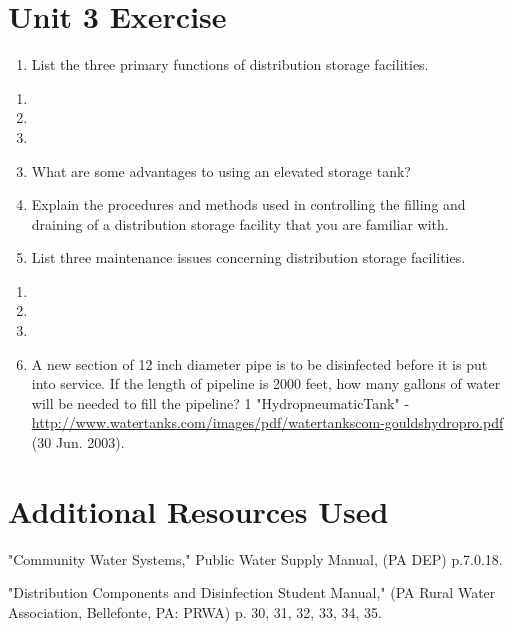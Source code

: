 \documentclass[10pt]{article}
\begin{document}
\section{Unit 3 Exercise}
\begin{enumerate}
  \item List the three primary functions of distribution storage facilities.
\end{enumerate}
\begin{enumerate}
  \item 
  \item 
  \item 
\end{enumerate}
\begin{enumerate}
  \setcounter{enumi}{2}
  \item What are some advantages to using an elevated storage tank?

  \item Explain the procedures and methods used in controlling the filling and draining of a distribution storage facility that you are familiar with.

  \item List three maintenance issues concerning distribution storage facilities.

\end{enumerate}
\begin{enumerate}
  \item 
  \item 
  \item 
\end{enumerate}
\begin{enumerate}
  \setcounter{enumi}{5}
  \item A new section of 12 inch diameter pipe is to be disinfected before it is put into service. If the length of pipeline is 2000 feet, how many gallons of water will be needed to fill the pipeline? 1 "HydropneumaticTank" - \href{http://www.watertanks.com/images/pdf/watertankscom-gouldshydropro.pdf}{http://www.watertanks.com/images/pdf/watertankscom-gouldshydropro.pdf} (30 Jun. 2003).
\end{enumerate}
\section{Additional Resources Used}
"Community Water Systems," Public Water Supply Manual, (PA DEP) p.7.0.18.

"Distribution Components and Disinfection Student Manual," (PA Rural Water Association, Bellefonte, PA: PRWA) p. 30, 31, 32, 33, 34, 35.
\end{document}
